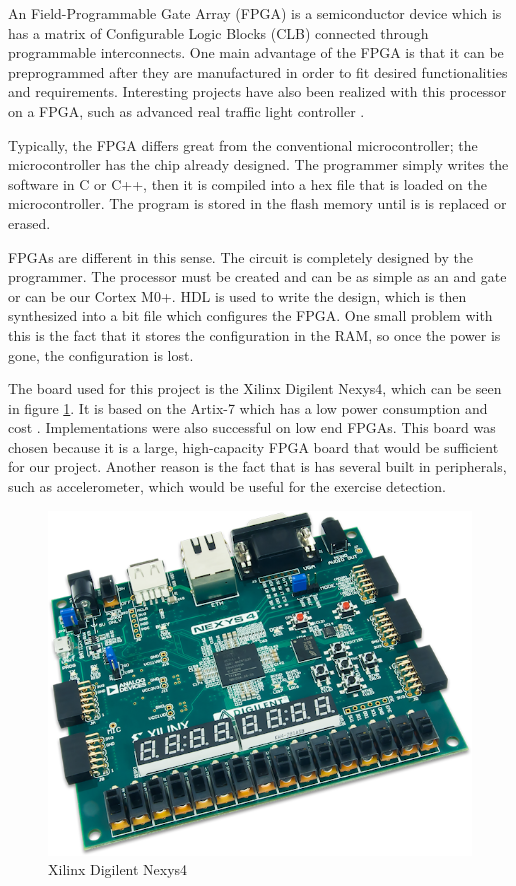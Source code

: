 
An Field-Programmable Gate Array (FPGA) is a semiconductor device which is has a matrix of Configurable Logic Blocks (CLB) connected through programmable interconnects. One main advantage of the FPGA is that it can be preprogrammed after they are manufactured in order to fit desired functionalities and requirements. Interesting projects have also been realized with this processor on a FPGA, such as advanced real traffic light controller \cite{traffic_light}.

Typically, the FPGA differs great from the conventional microcontroller; the microcontroller has the chip already designed. The programmer simply writes the software in C or C++, then it is compiled into a hex file that is loaded on the microcontroller. The program is stored in the flash memory until is is replaced or erased.

FPGAs are different in this sense. The circuit is completely designed by the programmer. The processor must be created and can be as simple as an and gate or can be our Cortex M0+. HDL is used to write the design, which is then synthesized into a bit file which configures the FPGA. One small problem with this is the fact that it stores the configuration in the RAM, so once the power is gone, the configuration is lost.

The board used for this project is the Xilinx Digilent Nexys4, which can be seen in figure \ref{fig:nexys4}. It is based on the Artix-7 which has a low power consumption and cost \cite{cortexm0onnexys4}. Implementations were also successful on low end FPGAs. This board was chosen because it is a large, high-capacity FPGA board that would be sufficient for our project. Another reason is the fact that is has several built in peripherals, such as accelerometer, which would be useful for the exercise detection. 

\begin{figure}
\centering
\includegraphics[scale=0.7]{figures/nexys4.PNG}
\caption{Xilinx Digilent Nexys4 \label{fig:nexys4}}
\end{figure}

